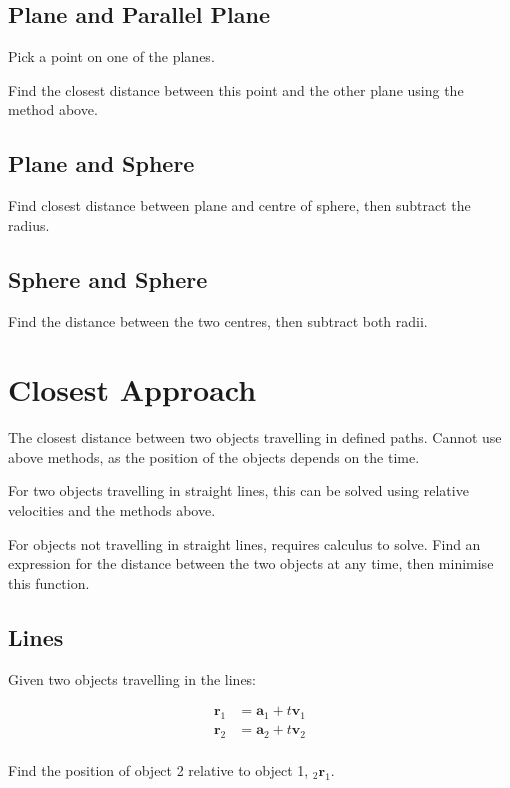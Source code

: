 \documentclass[a4paper,11pt]{report}
\newcommand{\bb}{\boldsymbol}
\begin{document}
\subsection{Plane and Parallel Plane}

Pick a point on one of the planes.

Find the closest distance between this point and the other plane using the
method above.

\subsection{Plane and Sphere}

Find closest distance between plane and centre of sphere, then subtract the
radius.

\subsection{Sphere and Sphere}

Find the distance between the two centres, then subtract both radii.


\section{Closest Approach}

The closest distance between two objects travelling in defined paths. Cannot
use above methods, as the position of the objects depends on the time.

For two objects travelling in straight lines, this can be solved using relative
velocities and the methods above.

For objects not travelling in straight lines, requires calculus to solve.
Find an expression for the distance between the two objects at any time, then
minimise this function.

\subsection{Lines}

Given two objects travelling in the lines:

$$
\begin{aligned}
\bb{r}_1 & = \bb{a}_1 + t \bb{v}_1 \\
\bb{r}_2 & = \bb{a}_2 + t \bb{v}_2 \\
\end{aligned}
$$

Find the position of object 2 relative to object 1, $_2\bb{r}_1$.
\end{document}
